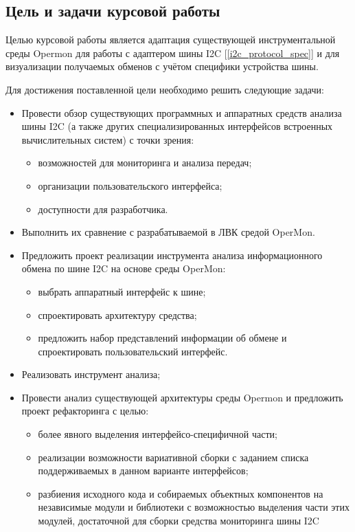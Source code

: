 \subsection*{Цель и задачи курсовой работы}

Целью курсовой работы является адаптация существующей инструментальной среды Opermon для работы с адаптером шины I2C [\ref{i2c_protocol_spec}] и для визуализации  получаемых обменов с учётом специфики устройства шины.

Для достижения поставленной цели необходимо решить следующие задачи:

\begin{itemize}
 \item Провести обзор существующих программных и аппаратных средств анализа шины I2C (а также других специализированных интерфейсов встроенных вычислительных систем) с точки зрения:
 
 \begin{itemize}
  \item возможностей для мониторинга и анализа передач;
  \item организации пользовательского интерфейса;
  \item доступности для разработчика.
 \end{itemize}
 
 \item Выполнить их сравнение с разрабатываемой в ЛВК средой OperMon.
 
 \item Предложить проект реализации инструмента анализа информационного обмена по шине I2C на основе среды OperMon:
 
 \begin{itemize}
  \item выбрать аппаратный интерфейс к шине;
  \item спроектировать архитектуру средства;
  \item предложить набор представлений информации об обмене и спроектировать пользовательский интерфейс.
 \end{itemize}

 
 \item Реализовать инструмент анализа;
 
 \item Провести анализ существующей архитектуры среды Opermon и предложить проект рефакторинга с целью:
 
 \begin{itemize}
  \item более явного выделения интерфейсо-специфичной части;
  \item реализации возможности вариативной сборки с заданием списка поддерживаемых в данном варианте интерфейсов;
  \item разбиения исходного кода и собираемых объектных компонентов на независимые модули и библиотеки с возможностью выделения части этих модулей, достаточной для сборки средства мониторинга шины I2C
 \end{itemize}
 
\end{itemize}
